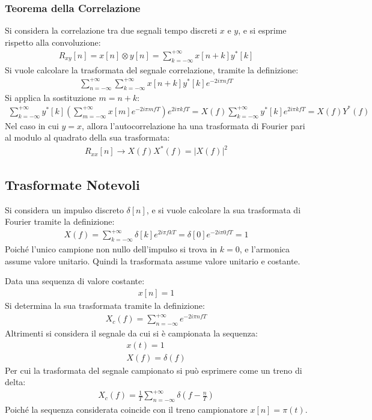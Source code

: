 \documentclass{article}
\numberwithin{equation}{subsection}
\begin{document}
\subsubsection{Teorema della Correlazione}

Si considera la correlazione tra due segnali tempo discreti $x$ e $y$, e si esprime rispetto alla convoluzione:
\begin{gather*}
    R_{xy}[n]=x[n]\otimes y[n]=\displaystyle\sum_{k=-\infty}^{+\infty}x[n+k]y^*[k]
\end{gather*}
Si vuole calcolare la trasformata del segnale correlazione, tramite la definizione:
\begin{gather*}
    \displaystyle\sum_{n=-\infty}^{+\infty}\sum_{k=-\infty}^{+\infty}x[n+k]y^*[k]e^{-2i\pi nfT}
\end{gather*}
Si applica la sostituzione $m=n+k$:
\begin{gather*}
    \displaystyle\sum_{k=-\infty}^{+\infty}y^*[k]\left(\sum_{m=-\infty}^{+\infty}x[m]e^{-2i\pi mfT}\right)e^{2i\pi kfT}= X(f)\sum_{k=-\infty}^{+\infty}y^*[k]e^{2i\pi kfT}=X(f)Y^*(f)
\end{gather*}
Nel caso in cui $y=x$, allora l'autocorrelazione ha una trasformata di Fourier pari al modulo al quadrato della sua trasformata:
\begin{gather*}
    R_{xx}[n]\to X(f)X^*(f)=|X(f)|^2
\end{gather*}

\subsection{Trasformate Notevoli}

Si considera un impulso discreto $\delta[n]$, e si vuole calcolare la sua trasformata di Fourier tramite la definizione:
\begin{gather}
    X(f)=\displaystyle\sum_{k=-\infty}^{+\infty}\delta[k]e^{2i\pi fkT}=\delta[0]e^{-2i\pi 0fT}=1
\end{gather}
Poiché l'unico campione non nullo dell'impulso si trova in $k=0$, e l'armonica assume valore unitario. Quindi la trasformata assume valore unitario e costante. 

Data una sequenza di valore costante:
\begin{gather*}
    x[n]=1
\end{gather*}
Si determina la sua trasformata tramite la definizione:
\begin{gather}
    X_c(f)=\displaystyle\sum_{n=-\infty}^{+\infty}e^{-2i\pi nfT}
\end{gather}
Altrimenti si considera il segnale da cui si è campionata la sequenza:
\begin{gather*}
    x(t)=1\\
    X(f)=\delta(f)
\end{gather*}
Per cui la trasformata del segnale campionato si può esprimere come un treno di delta:
\begin{gather}
    X_c(f)=\displaystyle\frac{1}{T}\sum_{n=-\infty}^{+\infty}\delta\left(f-\frac{n}{T}\right)
\end{gather}
Poiché la sequenza considerata coincide con il treno campionatore $x[n]=\pi(t)$.
\end{document}
